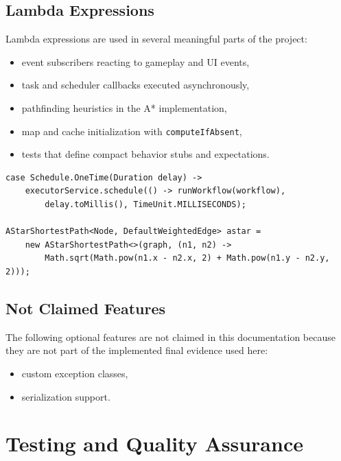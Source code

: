 \documentclass[12pt]{extarticle}
\begin{document}
\subsection{Lambda Expressions}
Lambda expressions are used in several meaningful parts of the project:
\begin{itemize}[leftmargin=1.5em]
    \item event subscribers reacting to gameplay and UI events,
    \item task and scheduler callbacks executed asynchronously,
    \item pathfinding heuristics in the A* implementation,
    \item map and cache initialization with \texttt{computeIfAbsent},
    \item tests that define compact behavior stubs and expectations.
\end{itemize}

\begin{lstlisting}[caption={Lambda expressions in scheduling and pathfinding}]
case Schedule.OneTime(Duration delay) ->
    executorService.schedule(() -> runWorkflow(workflow),
        delay.toMillis(), TimeUnit.MILLISECONDS);

AStarShortestPath<Node, DefaultWeightedEdge> astar =
    new AStarShortestPath<>(graph, (n1, n2) ->
        Math.sqrt(Math.pow(n1.x - n2.x, 2) + Math.pow(n1.y - n2.y, 2)));
\end{lstlisting}

\subsection{Not Claimed Features}
The following optional features are not claimed in this documentation because they are not part of the implemented final evidence used here:
\begin{itemize}[leftmargin=1.5em]
    \item custom exception classes,
    \item serialization support.
\end{itemize}

\section{Testing and Quality Assurance}
\end{document}
